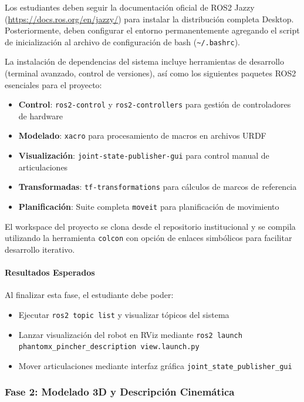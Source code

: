Los estudiantes deben seguir la documentación oficial de ROS2 Jazzy (\url{https://docs.ros.org/en/jazzy/}) para instalar la distribución completa Desktop. Posteriormente, deben configurar el entorno permanentemente agregando el script de inicialización al archivo de configuración de bash (\texttt{\textasciitilde/.bashrc}).

La instalación de dependencias del sistema incluye herramientas de desarrollo (terminal avanzado, control de versiones), así como los siguientes paquetes ROS2 esenciales para el proyecto:

\begin{itemize}
    \item \textbf{Control}: \texttt{ros2-control} y \texttt{ros2-controllers} para gestión de controladores de hardware
    \item \textbf{Modelado}: \texttt{xacro} para procesamiento de macros en archivos URDF
    \item \textbf{Visualización}: \texttt{joint-state-publisher-gui} para control manual de articulaciones
    \item \textbf{Transformadas}: \texttt{tf-transformations} para cálculos de marcos de referencia
    \item \textbf{Planificación}: Suite completa \texttt{moveit} para planificación de movimiento
\end{itemize}

El workspace del proyecto se clona desde el repositorio institucional y se compila utilizando la herramienta \texttt{colcon} con opción de enlaces simbólicos para facilitar desarrollo iterativo.

\paragraph{Resultados Esperados}

Al finalizar esta fase, el estudiante debe poder:
\begin{itemize}
    \item Ejecutar \texttt{ros2 topic list} y visualizar tópicos del sistema
    \item Lanzar visualización del robot en RViz mediante \texttt{ros2 launch phantomx\_pincher\_description view.launch.py}
    \item Mover articulaciones mediante interfaz gráfica \texttt{joint\_state\_publisher\_gui}
\end{itemize}

\subsubsection{Fase 2: Modelado 3D y Descripción Cinemática}

